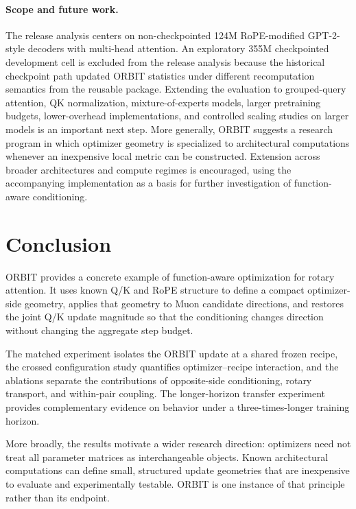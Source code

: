 \documentclass[10pt]{article}
\begin{document}
\paragraph{Scope and future work.}
The release analysis centers on non-checkpointed 124M RoPE-modified GPT-2-style decoders
with multi-head attention. An exploratory 355M checkpointed development cell is excluded
from the release analysis because the historical checkpoint path updated ORBIT statistics
under different recomputation semantics from the reusable package. Extending the evaluation
to grouped-query attention, QK normalization, mixture-of-experts models, larger pretraining
budgets, lower-overhead implementations, and controlled scaling studies on larger models is
an important next step. More generally, ORBIT suggests a research program in which optimizer
geometry is specialized to architectural computations whenever an inexpensive local metric
can be constructed. Extension across broader architectures and compute regimes is encouraged,
using the accompanying implementation as a basis for further investigation of function-aware
conditioning.

\section{Conclusion}
ORBIT provides a concrete example of function-aware optimization for rotary attention. It
uses known Q/K and RoPE structure to define a compact optimizer-side geometry, applies that
geometry to Muon candidate directions, and restores the joint Q/K update magnitude so that
the conditioning changes direction without changing the aggregate step budget.

The matched experiment isolates the ORBIT update at a shared frozen recipe, the crossed
configuration study quantifies optimizer--recipe interaction, and the ablations separate the
contributions of opposite-side conditioning, rotary transport, and within-pair coupling. The
longer-horizon transfer experiment provides complementary evidence on behavior under a
three-times-longer training horizon.

More broadly, the results motivate a wider research direction: optimizers need not treat all
parameter matrices as interchangeable objects. Known architectural computations can define
small, structured update geometries that are inexpensive to evaluate and experimentally
testable. ORBIT is one instance of that principle rather than its endpoint.



\end{document}
